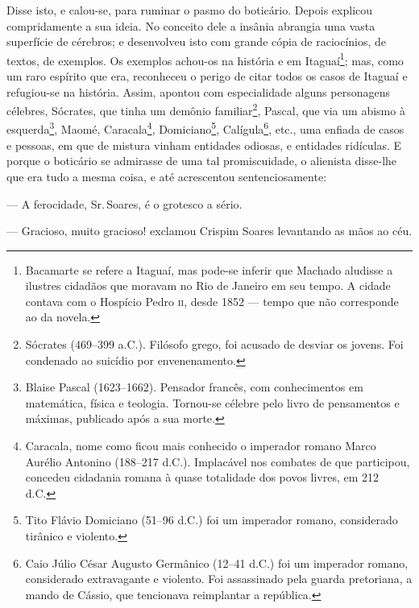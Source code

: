 Disse isto, e calou-se, para ruminar o pasmo do boticário. Depois
explicou compridamente a sua ideia. No conceito dele a insânia abrangia
uma vasta superfície de cérebros; e desenvolveu isto com grande cópia de
raciocínios, de textos, de exemplos. Os exemplos achou-os na história e
em Itaguaí\footnote{Bacamarte se refere a Itaguaí, mas pode-se inferir
  que Machado aludisse a ilustres cidadãos que moravam no Rio de Janeiro
  em seu tempo. A cidade contava com o Hospício Pedro \textsc{ii}, desde 1852 ---
  tempo que não corresponde ao da novela.}; mas, como um raro espírito
que era, reconheceu o perigo de citar todos os casos de Itaguaí e
refugiou-se na história. Assim, apontou com especialidade alguns
personagens célebres, Sócrates, que tinha um demônio familiar\footnote{Sócrates
  (469--399 a.C.). Filósofo grego, foi acusado de desviar os jovens. Foi
  condenado ao suicídio por envenenamento.}, Pascal, que via um abismo à
esquerda\footnote{Blaise Pascal (1623--1662). Pensador francês, com
  conhecimentos em matemática, física e teologia. Tornou-se célebre pelo
  livro de pensamentos e máximas, publicado após a sua morte.}, Maomé,
Caracala\footnote{Caracala, nome como ficou mais conhecido o imperador
  romano Marco Aurélio Antonino (188--217 d.C.). Implacável nos combates
  de que participou, concedeu cidadania romana à quase totalidade dos
  povos livres, em 212 d.C.}, Domiciano\footnote{Tito Flávio Domiciano
  (51--96 d.C.) foi um imperador romano, considerado tirânico e violento.},
Calígula\footnote{Caio Júlio César Augusto Germânico (12--41 d.C.) foi um
  imperador romano, considerado extravagante e violento. Foi assassinado
  pela guarda pretoriana, a mando de Cássio, que tencionava reimplantar
  a república.}, etc., uma enfiada de casos e pessoas, em que de mistura
vinham entidades odiosas, e entidades ridículas. E porque o boticário se
admirasse de uma tal promiscuidade, o alienista disse-lhe que era tudo a
mesma coisa, e até acrescentou sentenciosamente:

--- A ferocidade, Sr.\,Soares, é o grotesco a sério.

--- Gracioso, muito gracioso! exclamou Crispim Soares levantando as mãos
ao céu.

